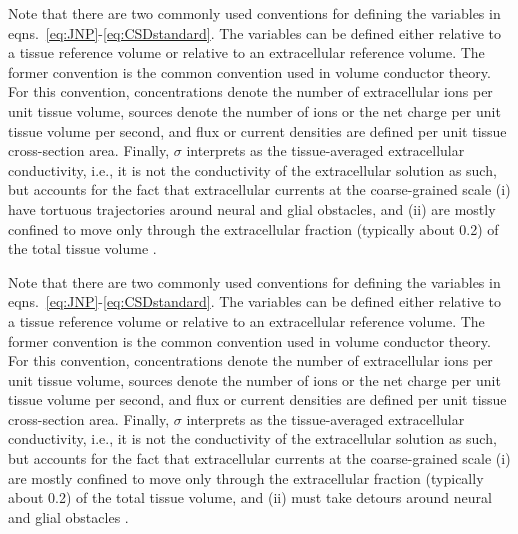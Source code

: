 \documentclass[preprint,11pt,authoryear]{elsarticle}
\begin{document}
Note that there are two commonly used conventions for defining the variables in eqns.~\ref{eq:JNP}-\ref{eq:CSDstandard}. The variables can be defined either relative to a tissue reference volume or relative to an extracellular reference volume. The former convention is the common convention used in volume conductor theory. For this convention, concentrations denote the number of extracellular ions per unit tissue volume, sources denote the number of ions or the net charge per unit tissue volume per second, and flux or current densities are defined per unit tissue cross-section area. Finally, $\sigma$ interprets as the tissue-averaged extracellular conductivity, i.e., it is not the conductivity of the extracellular solution as such, but accounts for the fact that extracellular currents at the coarse-grained scale (i) have tortuous trajectories around neural and glial obstacles, and (ii) are mostly confined to move only through the extracellular fraction (typically about 0.2) of the total tissue volume \citep{Nicholson1998, Nunez2006}.

Note that there are two commonly used conventions for defining the variables in eqns.~\ref{eq:JNP}-\ref{eq:CSDstandard}. The variables can be defined either relative to a tissue reference volume or relative to an extracellular reference volume. The former convention is the common convention used in volume conductor theory. For this convention, concentrations denote the number of extracellular ions per unit tissue volume, sources denote the number of ions or the net charge per unit tissue volume per second, and flux or current densities are defined per unit tissue cross-section area. Finally, $\sigma$ interprets as the tissue-averaged extracellular conductivity, i.e., it is not the conductivity of the extracellular solution as such, but accounts for the fact that extracellular currents at the coarse-grained scale (i) are mostly confined to move only through the extracellular fraction (typically about 0.2) of the total tissue volume, and (ii) must take detours around neural and glial obstacles \citep{Nicholson1998, Nunez2006}. 
\end{document}
